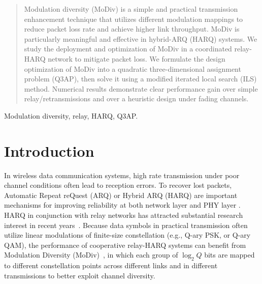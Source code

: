 \documentclass[journal]{IEEEtran}
\begin{document}
\begin{abstract}
Modulation diversity (MoDiv) is a simple and practical transmission enhancement
technique that utilizes different modulation mappings to reduce packet loss rate
and achieve higher link throughput. MoDiv is particularly meaningful and
effective in hybrid-ARQ (HARQ) systems. We study the deployment
and optimization of MoDiv in a coordinated relay-HARQ network to mitigate packet
loss.
We formulate the design optimization of MoDiv into a quadratic three-dimensional
assignment problem (Q3AP), then solve it using a modified iterated local search
(ILS) method. Numerical results demonstrate clear performance gain over simple
relay/retransmissions and over a heuristic design under fading channels.
\end{abstract}

\begin{IEEEkeywords}
    Modulation diversity, relay, HARQ, Q3AP.
\end{IEEEkeywords}

%
\IEEEpeerreviewmaketitle


\section{Introduction}
In wireless data communication systems, high rate transmission under poor
channel conditions often lead to reception errors. To recover lost packets,
Automatic Repeat reQuest (ARQ) or Hybrid ARQ (HARQ) are important mechanisms for improving
reliability at both network layer \cite{TS36.331} and PHY layer \cite{TS36.213}.
HARQ in conjunction with relay networks has attracted substantial research
interest in recent years~\cite{ngo2014hybrid}. Because data symbols in practical
transmission often utilize linear modulations of finite-size
constellation (e.g., Q-ary PSK, or Q-ary QAM), the performance of cooperative relay-HARQ systems can benefit from Modulation Diversity
(MoDiv)~\cite{benelli1992new}, in which each group of $\log_2 Q$ bits are mapped
to different constellation points across different links and in different
transmissions to better exploit channel diversity.
\end{document}
